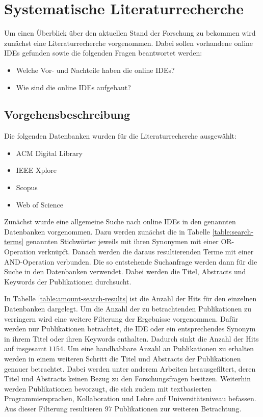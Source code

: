 \chapter{Systematische Literaturrecherche} \label{systematische_literaturrecherche}

Um einen Überblick über den aktuellen Stand der Forschung zu bekommen wird zunächst eine Literaturrecherche vorgenommen. Dabei sollen vorhandene online IDEs gefunden sowie die folgenden Fragen beantwortet werden:

\begin{itemize}
    \item Welche Vor- und Nachteile haben die online IDEs?
    \item Wie sind die online IDEs aufgebaut?
\end{itemize}

\section{Vorgehensbeschreibung}

Die folgenden Datenbanken wurden für die Literaturrecherche ausgewählt:

\begin{itemize}
    \item ACM Digital Library
    \item IEEE Xplore
    \item Scopus
    \item Web of Science
\end{itemize}

Zunächst wurde eine allgemeine Suche nach online IDEs in den genannten Datenbanken vorgenommen. Dazu werden zunächst die in Tabelle \ref{table:search-terms} genannten Stichwörter jeweils mit ihren Synonymen mit einer OR-Operation verknüpft. Danach werden die daraus resultierenden Terme mit einer AND-Operation verbunden. Die so entstehende Suchanfrage werden dann für die Suche in den Datenbanken verwendet. Dabei werden die Titel, Abstracts und Keywords der Publikationen durchsucht.

In Tabelle \ref{table:amount-search-results} ist die Anzahl der Hits für den einzelnen Datenbanken dargelegt. Um die Anzahl der zu betrachtenden Publikationen zu verringern wird eine weitere Filterung der Ergebnisse vorgenommen. Dafür werden nur Publikationen betrachtet, die IDE oder ein entsprechendes Synonym in ihrem Titel oder ihren Keywords enthalten. Dadurch sinkt die Anzahl der Hits auf insgesamt $1154$. Um eine handhabbare Anzahl an Publikationen zu erhalten werden in einem weiteren Schritt die Titel und Abstracts der Publikationen genauer betrachtet. Dabei werden unter anderem Arbeiten herausgefiltert, deren Titel und Abstracts keinen Bezug zu den Forschungsfragen besitzen. Weiterhin werden Publikationen bevorzugt, die sich zudem mit textbasierten Programmiersprachen, Kollaboration und Lehre auf Universitätsniveau befassen. Aus dieser Filterung resultieren $97$ Publikationen zur weiteren Betrachtung.

